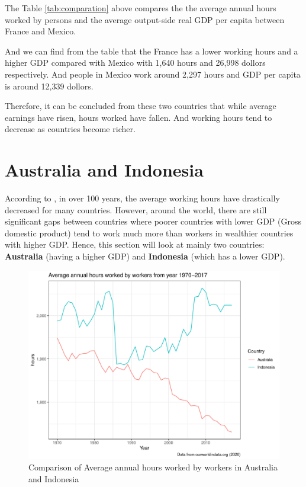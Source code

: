 \documentclass[11pt,a4paper,]{article}
\begin{document}
The Table \ref{tab:comparation} above compares the the average annual hours worked by persons and the average output-side real GDP per capita between France and Mexico.

And we can find from the table that the France has a lower working hours and a higher GDP compared with Mexico with 1,640 hours and 26,998 dollors respectively. And people in Mexico work around 2,297 hours and GDP per capita is around 12,339 dollors.

Therefore, it can be concluded from these two countries that while average earnings have risen, hours worked have fallen. And working hours tend to decrease as countries become richer.

\clearpage

\hypertarget{australia-and-indonesia}{%
\section{Australia and Indonesia}\label{australia-and-indonesia}}

According to \textcite{owidworkinghours}, in over 100 years, the average working hours have drastically decreased for many countries. However, around the world, there are still significant gaps between countries where poorer countries with lower GDP (Gross domestic product) tend to work much more than workers in wealthier countries with higher GDP. Hence, this section will look at mainly two countries: \textbf{Australia} (having a higher GDP) and \textbf{Indonesia} (which has a lower GDP).

\begin{figure}
\centering
\includegraphics{report_files/figure-latex/awh-1.pdf}
\caption{\label{fig:awh}Comparison of Average annual hours worked by workers in Australia and Indonesia}
\end{figure}
\end{document}
